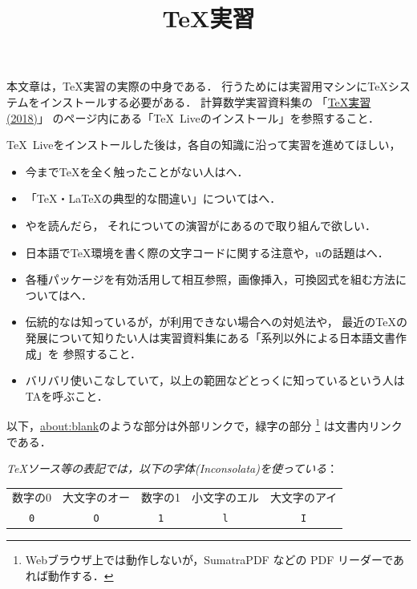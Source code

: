 \documentclass{ltjsarticle}
\title{\TeX 実習}
\begin{document}
\zw
\maketitle

本文章は，\TeX 実習の実際の中身である．
行うためには実習用マシンに\TeX システムをインストールする必要がある．
計算数学実習資料集の
「\href{https://github.com/utmsks/KSImaterial/blob/master/contents/tex/tex_practice.md}{\TeX 実習(2018)}」
のページ内にある「\TeX~Liveのインストール」を参照すること．


\TeX~Liveをインストールした後は，各自の知識に沿って実習を進めてほしい，
\begin{itemize}
\item 今まで\TeX を全く触ったことがない人はへ．
\item 「\TeX・\LaTeX の典型的な間違い」についてはへ．
\item {}やを読んだら，
 それについての演習がにあるので取り組んで欲しい．
\item 日本語で\TeX 環境を書く際の文字コードに関する注意や，u\pTeX の話題はへ．
\item 各種パッケージを有効活用して相互参照，画像挿入，可換図式を組む方法についてはへ．
\item 伝統的な\pLaTeX は知っているが，\pLaTeX が利用できない場合への対処法や，
最近の\TeX の発展について知りたい人は実習資料集にある「\pTeX 系列以外による日本語文書作成」を
参照すること．
\item バリバリ使いこなしていて，以上の範囲などとっくに知っているという人はTAを呼ぶこと．
\end{itemize}

以下，\url{about:blank}のような部分は外部リンクで，緑字の部分
\footnote{Webブラウザ上では動作しないが，SumatraPDF などの PDF リーダーであれば動作する．}
は文書内リンクである．

\bigskip

\emph{\TeX ソース等の表記では，以下の字体(Inconsolata)を使っている}：
\begin{center}
\begin{tabular}{ccccc}
\toprule
数字の0&大文字のオー&数字の1&小文字のエル&大文字のアイ\\
\cmidrule(lr){1-2}\cmidrule(lr){3-5}
\Large\texttt{0}&\Large\texttt{O}
&\Large\texttt{1}&\Large\texttt{l}&\Large\texttt{I}\\
\bottomrule
\end{tabular}
\end{center}
\end{document}
